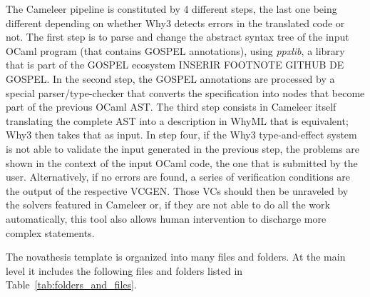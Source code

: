 {The Cameleer pipeline is constituted by 4 different steps, the last one being different depending on whether Why3 detects errors in the translated code or not.
The first step is to parse and change the abstract syntax tree of the input OCaml program (that contains GOSPEL annotations), using \emph{ppxlib}, a library that is part of the GOSPEL ecosystem INSERIR FOOTNOTE GITHUB DE GOSPEL.
In the second step, the GOSPEL annotations are processed by a special parser/type-checker that converts the specification into nodes that become part of the previous OCaml AST.
The third step consists in Cameleer itself translating the complete AST into a description in WhyML that is equivalent; Why3 then takes that as input.
In step four, if the Why3 type-and-effect system is not able to validate the input generated in the previous step, the problems are shown in the context of the input OCaml code, the one that is submitted by the user. 
Alternatively, if no errors are found, a series of verification conditions are the output of the respective VCGEN.
Those VCs should then be unraveled by the solvers featured in Cameleer or, if they are not able to do all the work automatically, this tool also allows human intervention to discharge more complex statements.






















\iffalse
The \gls{novathesis} template is organized into many files and folders. At the main level it includes the following files and folders listed in Table~\ref{tab:folders_and_files}.

\newcommand{\accessAllowed}{\texttt{[image: access\_allowed]}}
\newcommand{\accessForbiden}{\texttt{[image: dont\_touch]}}
\newcommand{\File}{\texttt{[image: file]}}
\newcommand{\Folder}{\texttt{[image: folder]}}


}
